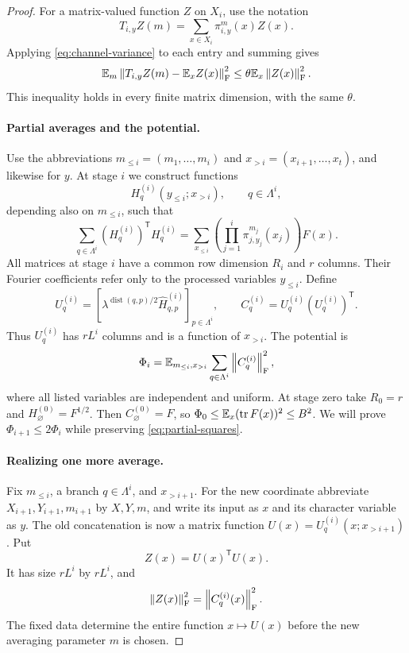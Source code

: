 \begin{proof}
For a matrix-valued function $Z$ on $X_i$, use the notation
\[
  T_{i,y}Z(m)=\sum_{x\in X_i}\pi_{i,y}^m(x)Z(x).
\]
Applying \eqref{eq:channel-variance} to each entry and summing gives
\begin{equation}\label{eq:matrix-channel-variance}
  \mathbb E_m\left\lVert T_{i,y}Z(m)-\mathbb E_xZ(x)\right\rVert_{\mathrm F}^2
  \le\theta\mathbb E_x\left\lVert Z(x)\right\rVert_{\mathrm F}^2.
\end{equation}
This inequality holds in every finite matrix dimension, with the same
$\theta$.

\paragraph{Partial averages and the potential.}
Use the abbreviations $m_{\le i}=(m_1,\ldots,m_i)$ and
$x_{>i}=(x_{i+1},\ldots,x_t)$, and likewise for $y$.
At stage $i$ we construct functions
\[
  H_q^{(i)}(y_{\le i};x_{>i}),\qquad q\in\Lambda^i,
\]
depending also on $m_{\le i}$, such that
\begin{equation}\label{eq:partial-squares}
  \sum_{q\in\Lambda^i}(H_q^{(i)})^{\mathsf T}H_q^{(i)}
  =\sum_{x_{\le i}}
       \left(\prod_{j=1}^i\pi_{j,y_j}^{m_j}(x_j)\right)F(x).
\end{equation}
All matrices at stage $i$ have a common row dimension $R_i$ and $r$
columns.  Their Fourier coefficients refer only to the processed
variables $y_{\le i}$.  Define
\begin{equation}\label{eq:partial-gram}
  U_q^{(i)}=
    \left[\lambda^{\operatorname{dist}(q,p)/2}
           \widehat H_{q,p}^{(i)}\right]_{p\in\Lambda^i},
  \qquad C_q^{(i)}=U_q^{(i)}(U_q^{(i)})^{\mathsf T}.
\end{equation}
Thus $U_q^{(i)}$ has $rL^i$ columns and is a function of $x_{>i}$.
The potential is
\[
  \Phi_i=\mathbb E_{m_{\le i},x_{>i}}
          \sum_{q\in\Lambda^i}\left\lVert C_q^{(i)}\right\rVert_{\mathrm F}^2,
\]
where all listed variables are independent and uniform.
At stage zero take $R_0=r$ and $H_{\varnothing}^{(0)}=F^{1/2}$.
Then $C_{\varnothing}^{(0)}=F$, so
$\Phi_0\le\mathbb E_x(\operatorname{tr} F(x))^2\le B^2$.
We will prove $\Phi_{i+1}\le2\Phi_i$ while preserving
\eqref{eq:partial-squares}.

\paragraph{Realizing one more average.}
Fix $m_{\le i}$, a branch $q\in\Lambda^i$, and $x_{>i+1}$.
For the new coordinate abbreviate $X_{i+1},Y_{i+1},m_{i+1}$ by
$X,Y,m$, and write its input as $x$ and its character variable as
$y$.  The old concatenation is now a matrix function
$U(x)=U_q^{(i)}(x;x_{>i+1})$.
Put
\[
  Z(x)=U(x)^{\mathsf T}U(x).
\]
It has size $rL^i$ by $rL^i$, and
\begin{equation}\label{eq:two-gram-norms}
  \left\lVert Z(x)\right\rVert_{\mathrm F}^2=\left\lVert C_q^{(i)}(x)\right\rVert_{\mathrm F}^2.
\end{equation}
The fixed data determine the entire function $x\mapsto U(x)$ before
the new averaging parameter $m$ is chosen.


\end{proof}
